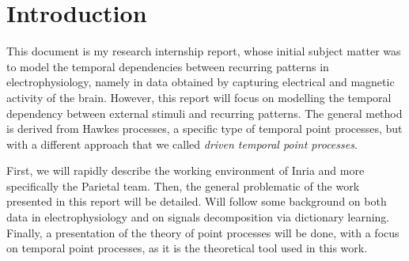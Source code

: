 \section{Introduction}

This document is my research internship report, whose initial subject matter was to model the temporal dependencies between recurring patterns in electrophysiology, namely in data obtained by capturing electrical and magnetic activity of the brain.
However, this report will focus on modelling the temporal dependency between external stimuli and recurring patterns.
The general method is derived from Hawkes processes, a specific type of temporal point processes, but with a different approach that we called \textit{driven temporal point processes}.

First, we will rapidly describe the working environment of Inria and more specifically the Parietal team.
Then, the general problematic of the work presented in this report will be detailed.
Will follow some background on both data in electrophysiology and on signals decomposition via dictionary learning.
Finally, a presentation of the theory of point processes will be done, with a focus on temporal point processes, as it is the theoretical tool used in this work.





